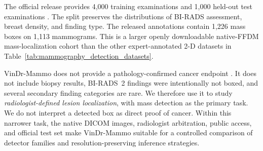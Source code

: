The official release provides 4,000 training examinations and 1,000 held-out
test examinations \cite{pham2022vindrphysionet}. The split preserves the
distributions of BI-RADS assessment, breast density, and finding type. The
released annotations contain 1,226 mass boxes on 1,113 mammograms. This is a
larger openly downloadable native-FFDM mass-localization cohort than the other
expert-annotated 2-D datasets in
Table~\ref{tab:mammography_detection_datasets}.

VinDr-Mammo does not provide a pathology-confirmed cancer endpoint
\cite{nguyen2023vindr}. It does not include biopsy results, BI-RADS~2 findings
were intentionally not boxed, and several secondary finding categories are
rare. We therefore use it to study \emph{radiologist-defined lesion
localization}, with mass detection as the primary task. We do not interpret a
detected box as direct proof of cancer. Within this narrower task, the native
DICOM images, radiologist arbitration, public access, and official test set
make VinDr-Mammo suitable for a controlled comparison of detector families and
resolution-preserving inference strategies.

